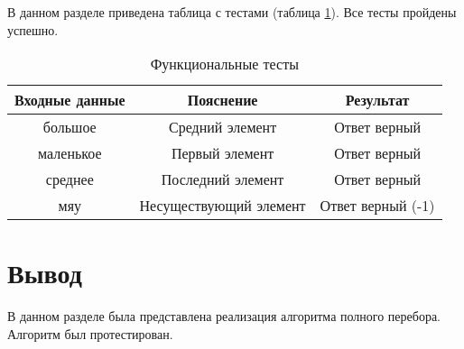 В данном разделе приведена таблица с тестами (таблица \ref{table:ref1}). Все тесты пройдены успешно.

\begin{center}
	\captionsetup{justification=raggedright,singlelinecheck=off}
	\begin{table}[ht]
		\centering
		\caption{Функциональные тесты}
		\label{table:ref1}
		\begin{tabular}{ |c|c|c|}
			\hline
			\textbf{Входные данные}    & \textbf{Пояснение}   	  & \textbf{Результат}    \\ \hline
			большое			  & Средний элемент   & Ответ верный \\ \hline
			маленькое 		  & Первый элемент    & Ответ верный \\ \hline
			среднее 		  & Последний элемент & Ответ верный \\ \hline
			мяу & Несуществующий элемент & Ответ верный (-1) \\ \hline
		\end{tabular}
	\end{table}
\end{center}

\section*{Вывод}
В данном разделе была представлена реализация алгоритма полного перебора. Алгоритм был протестирован. 
